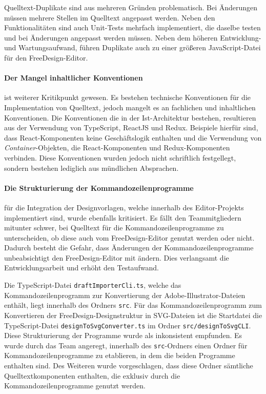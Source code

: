 Quelltext-Duplikate sind aus mehreren Gründen problematisch. Bei Änderungen müssen mehrere Stellen im Quelltext angepasst werden. Neben den Funktionalitäten sind auch Unit-Tests mehrfach implementiert, die daselbe testen und bei Änderungen angepasst werden müssen. Neben dem höheren Entwicklung- und Wartungsaufwand, führen Duplikate auch zu einer größeren JavaScript-Datei für den FreeDesign-Editor. 

\paragraph{Der Mangel inhaltlicher Konventionen} ist weiterer Kritikpunkt gewesen. Es bestehen technische Konventionen für die Implementation von Quelltext, jedoch mangelt es an fachlichen und inhaltlichen Konventionen. Die Konventionen die in der Ist-Architektur bestehen, resultieren aus der Verwendung von TypeScript, ReactJS und Redux. Beispiele hierfür sind, dass React-Komponenten keine Geschäftslogik enthalten und die Verwendung von \emph{Container}-Objekten, die React-Komponenten und Redux-Komponenten verbinden.
Diese Konventionen wurden jedoch nicht schriftlich festgellegt, sondern bestehen lediglich aus mündlichen Absprachen. 

\paragraph{Die Strukturierung der Kommandozeilenprogramme} für die Integration der Designvorlagen, welche innerhalb des Editor-Projekts implementiert sind, wurde ebenfalls kritisiert.
Es fällt den Teammitgliedern mitunter schwer, bei Quelltext für die Kommandozeilenprogramme zu unterscheiden, ob diese auch vom FreeDesign-Editor genutzt werden oder nicht. Dadurch besteht die Gefahr, dass Änderungen der Kommandozeilenprogramme unbeabsichtigt den FreeDesign-Editor mit ändern. Dies verlangsamt die Entwicklungsarbeit und erhöht den Testaufwand.

Die TypeScript-Datei \lstinline|draftImporterCli.ts|, welche das Kommandozeilenprogramm zur Konvertierung der Adobe-Illustrator-Dateien enthält, liegt innerhalb des Ordners \lstinline|src|. Für das Kommandozeilenprogramm zum Konvertieren der FreeDesign-Designstruktur in SVG-Dateien ist die Startdatei die TypeScript-Datei \lstinline|designToSvgConverter.ts| im Ordner \lstinline|src/designToSvgCLI|. Diese Strukturierung der Programme wurde als inkonsistent empfunden. 
Es wurde durch das Team angeregt, innerhalb des \lstinline|src|-Ordners einen Ordner für Kommandozeilenprogramme zu etablieren, in dem die beiden Programme enthalten sind. Des Weiteren wurde vorgeschlagen, dass diese Ordner sämtliche Quelltextkomponenten enthalten, die exklusiv durch die Kommandozeilenprogramme genutzt werden.  


